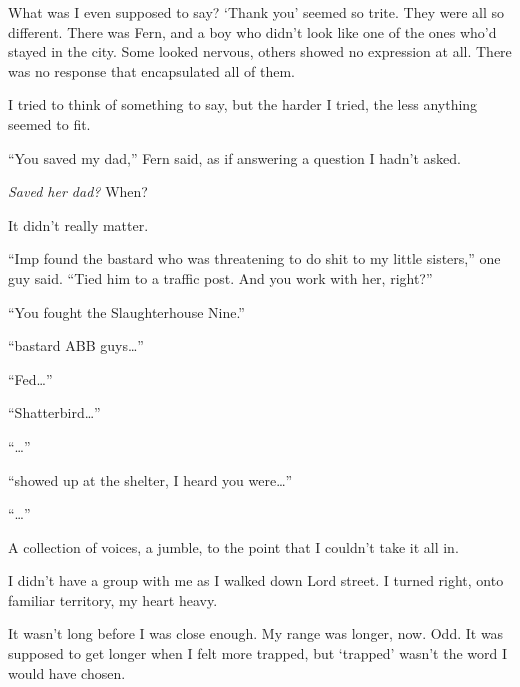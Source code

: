 What was I even supposed to say?  `Thank you' seemed so trite.  They were all so different.  There was Fern, and a boy who didn't look like one of the ones who'd stayed in the city.  Some looked nervous, others showed no expression at all.  There was no response that encapsulated all of them.



I tried to think of something to say, but the harder I tried, the less anything seemed to fit.



``You saved my dad,'' Fern said, as if answering a question I hadn't asked.



\emph{Saved her dad?}  When?



It didn't really matter.



``Imp found the bastard who was threatening to do shit to my little sisters,'' one guy said. ``Tied him to a traffic post.  And you work with her, right?''



``You fought the Slaughterhouse Nine.''



``\ldotsthose bastard ABB guys\ldots''



``Fed\ldots''



``\ldotswhen Shatterbird\ldots''



``\ldotsMannequin\ldots''



``\ldotsLeviathan showed up at the shelter, I heard you were\ldots''



``\ldotsEmpire\ldots''



A collection of voices, a jumble, to the point that I couldn't take it all in.



\sectionbreak



I didn't have a group with me as I walked down Lord street.  I turned right, onto familiar territory, my heart heavy.



It wasn't long before I was close enough.  My range was longer, now.  Odd.  It was supposed to get longer when I felt more trapped, but `trapped' wasn't the word I would have chosen.



